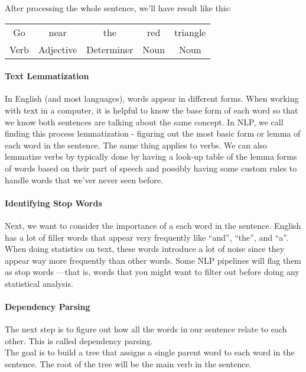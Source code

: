 After processing the whole sentence, we'll have result like this:
\begin{table}[h]
    \centering
    \begin{tabular}{ccccc}
        Go   & near      & the        & red  & triangle \\
        Verb & Adjective & Determiner & Noun & Noun    
    \end{tabular}
\end{table}

\paragraph{Text Lemmatization}
In English (and most languages), words appear in different forms. When working with text in a computer, it is helpful to know the base form of each word so that we know both sentences are talking about the same concept. In NLP, we call finding this process lemmatization - figuring out the most basic form or lemma of each word in the sentence. The same thing applies to verbs. We can also lemmatize verbs by typically done by having a look-up table of the lemma forms of words based on their part of speech and possibly having some custom rules to handle words that we'ver never seen before.

\paragraph{Identifying Stop Words}
Next, we want to consider the importance of a each word in the sentence. English has a lot of filler words that appear very frequently like “and”, “the”, and “a”. When doing statistics on text, these words introduce a lot of noise since they appear way more frequently than other words. Some NLP pipelines will flag them as stop words —that is, words that you might want to filter out before doing any statistical analysis.

\paragraph{Dependency Parsing}
The next step is to figure out how all the words in our sentence relate to each other. This is called dependency parsing.\\

The goal is to build a tree that assigns a single parent word to each word in the sentence. The root of the tree will be the main verb in the sentence.\\

